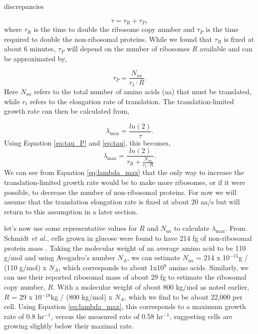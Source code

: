 discrepancies \documentclass[11pt, letterpaper]{article}
\begin{document}
\begin{equation}
	\tau = \tau_R + \tau_P,
\label{eq:tau}
\end{equation}
where $\tau_R$ is the time to double the ribosome copy number and $\tau_P$ is the time
required to double the non-ribosomal proteins. While we found that $\tau_R$ is fixed
at about 6 minutes,  $\tau_P$  will depend on the number of ribosomes $R$ available and
can be approximated by,

\begin{equation}
\tau_P = \frac{N_{aa}}{r_t \cdot R}.
\label{eq:tau_P}
\end{equation}
Here $N_{aa}$ refers to the total number of amino acids (aa) that must be
translated, while $r_t$ refers to the elongation rate of translation.
The translation-limited growth rate can then be calculated from,

\begin{equation}
\lambda_{\text{max}} =  \frac{ln(2)} {\tau}.
\end{equation}
Using Equation \ref{eq:tau_P} and \ref{eq:tau}, this becomes,
\begin{equation}
\lambda_{\text{max}} =  \frac{ln(2)} {\tau_R + \frac{N_{aa}}{r_t \cdot R}}.
\label{eq:lambda_max}
\end{equation}
We can see from Equation \ref{eq:lambda_max} that the only way to increase the
translation-limited growth rate would be to make more ribosomes, or if it were
possible, to decrease the number of non-ribosomal proteins. For now we will assume
that the translation elongation rate is fixed at about 20 aa/s but will return to this
assumption in a later section.

let's now use some representative values for $R$ and $N_{aa}$ to calculate
$\lambda_{\text{max}}$. From Schmidt {\it et al.}, cells grown in glucose were
found to have 214 fg of non-ribosomal  protein mass \cite{Schmidt2016}. Taking
the molecular weight of an average amino acid to be 110 g/mol and using Avogadro's number $N_A$, we can estimate
$N_{aa}$ = 214 x 10$^{-15}$g / (110 g/mol) x $N_A$,
which corresponds to about 1x10$^9$ amino acids.  Similarly, we can use their
reported ribosomal mass of about 29 fg to estimate the ribosomal copy number,
$R$. With a molecular weight of about 800 kg/mol as noted earlier,  $R$ =
29 x 10$^{-18}$kg / (800 kg/mol) x $N_A$,   which we find to be about 22,000 per
cell. Using Equation \ref{eq:lambda_max}, this corresponds to a maximum growth
rate of 0.8 hr$^{-1}$, versus the measured rate of 0.58 hr$^{-1}$, suggesting
cells are growing slightly below their maximal rate.
\end{document}

